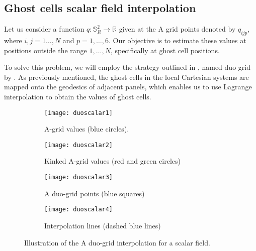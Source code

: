 \subsection{Ghost cells scalar field interpolation}
\label{cs-interp}
Let us consider a function $q: \mathbb{S}^2_R \to \mathbb{R}$ given at the A grid points
denoted by $q_{ijp}$, where $i, j=1\ldots, N$ and $p=1,\ldots, 6$. 
Our objective is to estimate these values at positions outside the range $1, \ldots, N$, specifically at ghost cell positions.

To solve this problem, we will employ the strategy outlined in \citet{zerroukat:2022}, 
named duo grid by \citet{chen:2021}.
As previously mentioned, the ghost cells in the local Cartesian systems are mapped onto the geodesics 
of adjacent panels, which enables us to use Lagrange interpolation to obtain the values of ghost cells.
\begin{figure}[!htb]
	\centering
	\begin{subfigure}{0.45\textwidth}
		\centering
		\texttt{[image: duoscalar1]}
		\caption{A-grid values (blue circles).\label{cs-duoscalar-1}}
	\end{subfigure}
	\begin{subfigure}{0.45\textwidth}
		\centering
		\texttt{[image: duoscalar2]}
		\caption{Kinked A-grid values (red and green circles)\label{cs-duoscalar-2}}
	\end{subfigure}

	\begin{subfigure}{0.45\textwidth}
		\centering
		\texttt{[image: duoscalar3]}
		\caption{A duo-grid points (blue squares)\label{cs-duoscalar-3}}
	\end{subfigure}
	\begin{subfigure}{0.45\textwidth}
	\centering
	\texttt{[image: duoscalar4]}
	\caption{Interpolation lines (dashed blue lines)\label{cs-duoscalar-4}}
    \end{subfigure}
 	\caption{Illustration of the A duo-grid interpolation for a scalar field. \label{cs-duoscalar}}
\end{figure}

